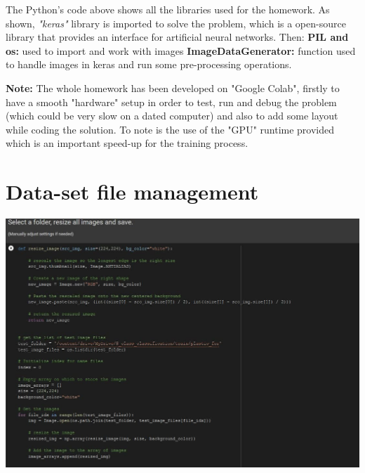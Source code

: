 \documentclass[11pt]{scrartcl}
\begin{document}
\noindent
\large{The Python's code above shows all the libraries used for the homework. As shown, \textit{"keras"} library is imported to solve the problem, which is a open-source library that provides an interface for artificial neural networks. \newline
Then: \newline
\textbf{PIL and os:} used to import and work with images \newline
\textbf{ImageDataGenerator:} function used to handle images in keras and run some pre-processing operations. \newline

\vspace{0.5cm}

\noindent
\textbf{\large{Note:}}\large{ The whole homework has been developed on "Google Colab", firstly to have a smooth "hardware" setup in order to test, run and debug the problem (which could be very slow on a dated computer) and also to add some layout while coding the solution. To note is the use of the "GPU" runtime provided which is an important speed-up for the training process.}

\newpage
\section{Data-set file management}


\vspace{0.4cm}
\hspace{-0.8in}\includegraphics[width=1.3\textwidth]{datasetfile.png}
\vspace{0.3cm}

}
\end{document}
